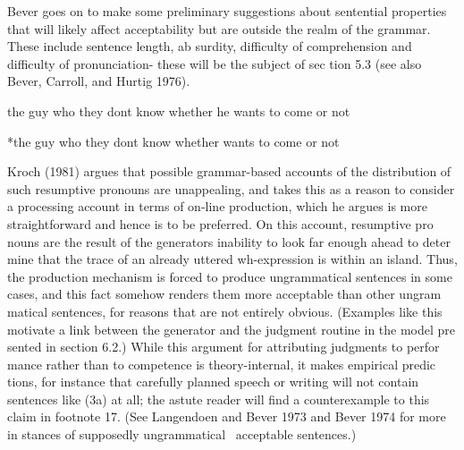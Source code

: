 \begin{listWWNumlxiiileveli}
\item 
\begin{styleStandard}
Bever goes on to make some preliminary suggestions about sentential properties that will likely affect acceptability but are outside the realm of the grammar. These include sentence length, ab\- surdity, difficulty of comprehension and difficulty of pronunciation- these will be the subject of sec\- tion 5.3 (see also Bever, Carroll, and Hurtig 1976).
\end{styleStandard}


\end{listWWNumlxiiileveli}
\clearpage\setcounter{page}{1}\setcounter{listWWNumlxiileveli}{0}
\begin{listWWNumlxiileveli}
\item 
\begin{styleStandard}
the guy who they don{\textquotesingle}t know whether he wants to come or not
\end{styleStandard}


\item 
\begin{styleStandard}
*the guy who they don{\textquotesingle}t know whether wants to come or not
\end{styleStandard}


\end{listWWNumlxiileveli}
\begin{styleStandard}
Kroch (1981) argues that possible grammar-based accounts of the distribution of such resumptive pronouns are unappealing, and takes this as a reason to consider a processing account in terms of on-line production, which he argues is more straightforward and hence is to be preferred. On this account, resumptive pro\- nouns are the result of the generator{\textquotesingle}s inability to look far enough ahead to deter\- mine that the trace of an already uttered wh-expression is within an island. Thus, the production mechanism is forced to produce ungrammatical sentences in some cases, and this fact somehow renders them more acceptable than other ungram\- matical sentences, for reasons that are not entirely obvious. (Examples like this motivate a link between the generator and the judgment routine in the model pre\- sented in section 6.2.) While this argument for attributing judgments to perfor\- mance rather than to competence is theory-internal, it makes empirical predic\- tions, for instance that carefully planned speech or writing will not contain sentences like (3a) at all; the astute reader will find a counterexample to this claim in footnote 17. (See Langendoen and Bever 1973 and Bever 1974 for more in\- stances of supposedly ungrammatical \ acceptable sentences.)
\end{styleStandard}


